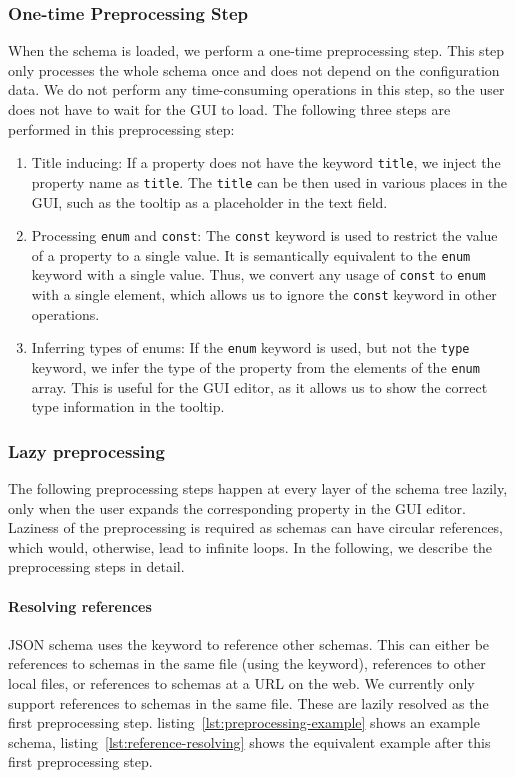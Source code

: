 \subsubsection{One-time Preprocessing Step}
When the schema is loaded, we perform a one-time preprocessing step.
This step only processes the whole schema once and does not depend on the configuration data.
We do not perform any time-consuming operations in this step, so the user does not have to wait for the GUI to load.
The following three steps are performed in this preprocessing step:
\begin{enumerate}
    \item Title inducing: If a property does not have the keyword \texttt{title}, we inject the property name as \texttt{title}.
    The \texttt{title} can be then used in various places in the GUI, such as the tooltip as a placeholder in the text field.
    \item Processing \texttt{enum} and \texttt{const}: The \texttt{const} keyword is used to restrict the value of a property to a single value.
    It is semantically equivalent to the \texttt{enum} keyword with a single value.
    Thus, we convert any usage of \texttt{const} to \texttt{enum} with a single element, which allows us to ignore the \texttt{const} keyword in other operations.
    \item Inferring types of enums: If the \texttt{enum} keyword is used, but not the \texttt{type} keyword, we infer the type of the property from the elements of the \texttt{enum} array.
    This is useful for the GUI editor, as it allows us to show the correct type information in the tooltip.
\end{enumerate}

\subsubsection{Lazy preprocessing}
The following preprocessing steps happen at every layer of the schema tree lazily, only when the user expands the corresponding property in the GUI editor.
Laziness of the preprocessing is required as schemas can have circular references, which would, otherwise, lead to infinite loops.
In the following, we describe the preprocessing steps in detail.

\paragraph{Resolving references}
JSON schema uses the  keyword to reference other schemas.
This can either be references to schemas in the same file (using the  keyword), references to other local files,
or references to schemas at a URL on the web.
We currently only support references to schemas in the same file.
These are lazily resolved as the first preprocessing step.
listing~\ref{lst:preprocessing-example} shows an example schema, listing~\ref{lst:reference-resolving} shows the equivalent example after
this first preprocessing step.

